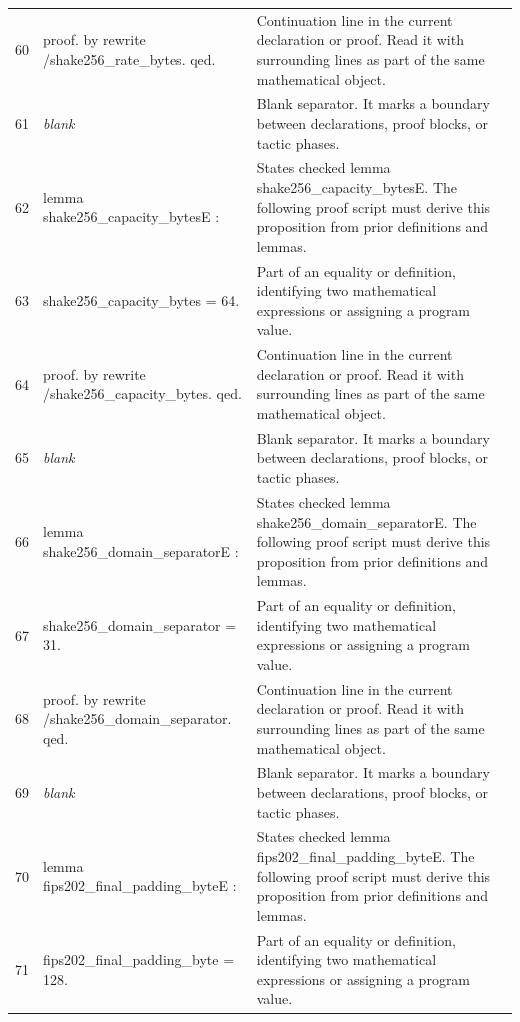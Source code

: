 \documentclass[10pt]{article}
\begin{document}
\begin{longtable}{r L{0.53\textwidth} L{0.37\textwidth}}
60 & {\ttfamily\scriptsize proof. by rewrite /shake256\_rate\_bytes. qed.} & Continuation line in the current declaration or proof.  Read it with surrounding lines as part of the same mathematical object. \\
61 & {\ttfamily\scriptsize \emph{blank}} & Blank separator.  It marks a boundary between declarations, proof blocks, or tactic phases. \\
62 & {\ttfamily\scriptsize lemma shake256\_capacity\_bytesE :} & States checked lemma shake256\_capacity\_bytesE.  The following proof script must derive this proposition from prior definitions and lemmas. \\
63 & {\ttfamily\scriptsize   shake256\_capacity\_bytes = 64.} & Part of an equality or definition, identifying two mathematical expressions or assigning a program value. \\
64 & {\ttfamily\scriptsize proof. by rewrite /shake256\_capacity\_bytes. qed.} & Continuation line in the current declaration or proof.  Read it with surrounding lines as part of the same mathematical object. \\
65 & {\ttfamily\scriptsize \emph{blank}} & Blank separator.  It marks a boundary between declarations, proof blocks, or tactic phases. \\
66 & {\ttfamily\scriptsize lemma shake256\_domain\_separatorE :} & States checked lemma shake256\_domain\_separatorE.  The following proof script must derive this proposition from prior definitions and lemmas. \\
67 & {\ttfamily\scriptsize   shake256\_domain\_separator = 31.} & Part of an equality or definition, identifying two mathematical expressions or assigning a program value. \\
68 & {\ttfamily\scriptsize proof. by rewrite /shake256\_domain\_separator. qed.} & Continuation line in the current declaration or proof.  Read it with surrounding lines as part of the same mathematical object. \\
69 & {\ttfamily\scriptsize \emph{blank}} & Blank separator.  It marks a boundary between declarations, proof blocks, or tactic phases. \\
70 & {\ttfamily\scriptsize lemma fips202\_final\_padding\_byteE :} & States checked lemma fips202\_final\_padding\_byteE.  The following proof script must derive this proposition from prior definitions and lemmas. \\
71 & {\ttfamily\scriptsize   fips202\_final\_padding\_byte = 128.} & Part of an equality or definition, identifying two mathematical expressions or assigning a program value. \\

\end{longtable}
\end{document}
